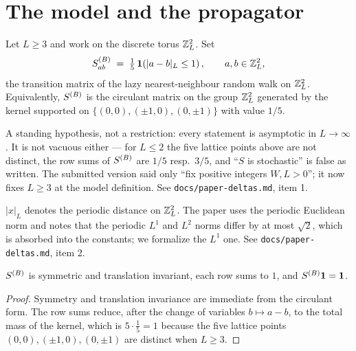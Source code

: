 %

\chapter{The model and the propagator}

\begin{definition}\label{def:SB}
  \leanok
  Let $L\ge 3$ and work on the discrete torus $\mathbb{Z}_L^2$.  Set
  \[ S^{(B)}_{ab} \;=\; \tfrac15\,\mathbf 1\!\left(|a-b|_L\le 1\right),\qquad a,b\in\mathbb{Z}_L^2, \]
  the transition matrix of the lazy nearest-neighbour random walk on $\mathbb{Z}_L^2$.
  Equivalently, $S^{(B)}$ is the circulant matrix on the group $\mathbb{Z}_L^2$ generated by the
  kernel supported on $\{(0,0),(\pm1,0),(0,\pm1)\}$ with value $1/5$.
\end{definition}

\begin{remark}[Why $L\ge3$]\label{rem:L3}
  A standing hypothesis, not a restriction: every statement is asymptotic in
  $L\to\infty$.  It is not vacuous either --- for $L\le2$ the five lattice points
  above are not distinct, the row sums of $S^{(B)}$ are $1/5$ resp.\ $3/5$, and
  ``$S$ is stochastic'' is false as written.  The submitted version said only
  ``fix positive integers $W,L>0$''; it now fixes $L\ge3$ at the model definition.
  See \texttt{docs/paper-deltas.md}, item 1.
\end{remark}

\begin{definition}\label{def:dist}
  \leanok
  $|x|_L$ denotes the periodic distance on $\mathbb{Z}_L^2$.  The paper uses the periodic
  Euclidean norm and notes that the periodic $L^1$ and $L^2$ norms differ by at
  most $\sqrt2$, which is absorbed into the constants; we formalize the $L^1$
  one.  See \texttt{docs/paper-deltas.md}, item 2.
\end{definition}

\begin{lemma}\label{lem:SB-basic}
  \leanok
  $S^{(B)}$ is symmetric and translation invariant, each row sums to $1$, and
  $S^{(B)}\mathbf 1=\mathbf 1$.
\end{lemma}
\begin{proof}\leanok
  Symmetry and translation invariance are immediate from the circulant form.  The
  row sums reduce, after the change of variables $b\mapsto a-b$, to the total mass
  of the kernel, which is $5\cdot\frac15=1$ because the five lattice points
  $(0,0),(\pm1,0),(0,\pm1)$ are distinct when $L\ge3$.
\end{proof}

